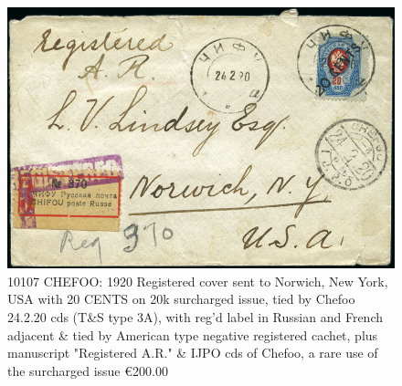 \begin{figure}[htbp]
\centering
\includegraphics[width=.95\textwidth]{../russian-post-offices-in-china/10107.jpg}
\caption{
10107	CHEFOO: 1920 Registered cover sent to Norwich, New York, USA with 20 
CENTS on 20k surcharged issue, tied by Chefoo 24.2.20 cds (T\&S type 3A), 
with reg'd label in Russian and French adjacent \& tied by American 
type negative registered cachet, plus manuscript "Registered A.R." \& IJPO cds 
of Chefoo, a rare use of the surcharged issue
\euro 200.00
}  
\end{figure}    
  
  
  
  
  
  
  
  
  
  
  
                    